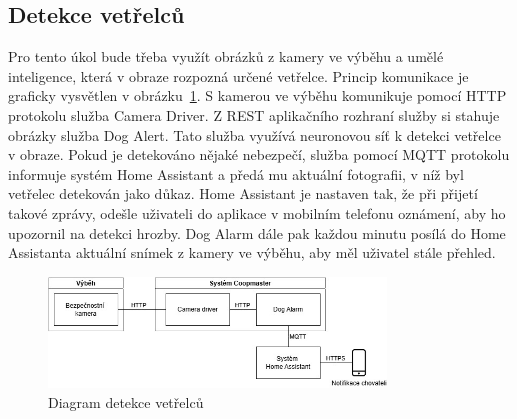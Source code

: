 \subsection{Detekce vetřelců}
Pro tento úkol bude třeba využít obrázků z kamery ve výběhu a umělé inteligence, která v obraze rozpozná určené vetřelce.
Princip komunikace je graficky vysvětlen v obrázku~\ref{fig:detekce_vetrelcu}.\newline
S kamerou ve výběhu komunikuje pomocí HTTP protokolu služba Camera Driver.
Z REST aplikačního rozhraní služby si stahuje obrázky služba Dog Alert.
Tato služba využívá neuronovou síť k detekci vetřelce v obraze.
Pokud je detekováno nějaké nebezpečí, služba pomocí MQTT protokolu informuje systém Home Assistant a předá mu aktuální fotografii, v níž byl vetřelec detekován jako důkaz.
Home Assistant je nastaven tak, že při přijetí takové zprávy, odešle uživateli do aplikace v mobilním telefonu oznámení, aby ho upozornil na detekci hrozby.
Dog Alarm dále pak každou minutu posílá do Home Assistanta aktuální snímek z kamery ve výběhu, aby měl uživatel stále přehled.
\begin{figure}[h]
    \centering
    \includegraphics[width=0.8\textwidth]{img/detekce_vetrelcu}
    \caption{Diagram detekce vetřelců}
    \label{fig:detekce_vetrelcu}
\end{figure}

